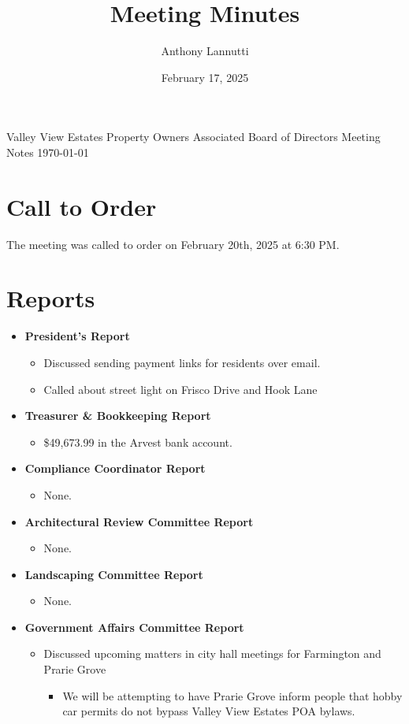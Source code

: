 \documentclass[10pt,a4paper]{article}
\author{Anthony Lannutti}
\date{February 17, 2025}
\title{Meeting Minutes}
\begin{document}
\begin{center}
  Valley View Estates Property Owners Associated Board of Directors Meeting Notes\break{}
  \today{}
\end{center}

\section*{Call to Order}
\begin{flushleft}
The meeting was called to order on February 20th, 2025 at 6:30 PM\@.
\end{flushleft}


\section*{Reports}
\begin{itemize}
  \item \textbf{President's Report}
  \begin{itemize}
    \item Discussed sending payment links for residents over email.
    \item Called about street light on Frisco Drive and Hook Lane
  \end{itemize}
  \item \textbf{Treasurer \& Bookkeeping Report}
  \begin{itemize}
    \item \$49,673.99 in the Arvest bank account.
  \end{itemize}
  \item \textbf{Compliance Coordinator Report}
  \begin{itemize}
    \item None.
  \end{itemize}
  \item \textbf{Architectural Review Committee Report}
  \begin{itemize}
    \item None.
  \end{itemize}
  \item \textbf{Landscaping Committee Report}
  \begin{itemize}
    \item None.
  \end{itemize}
  \item \textbf{Government Affairs Committee Report}
  \begin{itemize}
    \item Discussed upcoming matters in city hall meetings for Farmington and Prarie Grove
    \begin{itemize}
      \item We will be attempting to have Prarie Grove inform people that hobby car permits do not bypass Valley View Estates POA bylaws.
    \end{itemize}
  \end{itemize}
\end{itemize}
\end{document}
